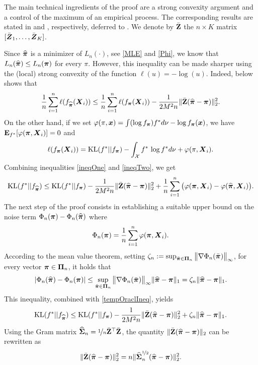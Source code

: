The main technical ingredients of the proof are a strong convexity argument and a control of
the maximum of an empirical process. The corresponding results are stated in 
and , respectively, deferred to  . We denote by 
$\bar{\mathbf Z}$ the $n\times K$ matrix $[\bar{\boldsymbol Z}_1,\ldots,\bar{\boldsymbol Z}_K]$.

Since $\widehat{\boldsymbol \pi}$ is a minimizer of $L_n(\cdot)$, see \eqref{MLE} and \eqref{Phi}, we know that
$L_n(\widehat{\boldsymbol \pi})\le L_n(\boldsymbol \pi)$ for every $\pi$. However, this inequality can be made sharper using the
(local) strong convexity of the function $\ell(u) = -\log(u)$. Indeed,  below
shows that
\begin{equation}\label{ineqOne}
\frac{1}{n}\sum_{i=1}^n \ell(f_{\widehat{\boldsymbol \pi}}(\boldsymbol X_i)) \leq
\frac{1}{n}\sum_{i=1}^n \ell(f_{\boldsymbol \pi}(\boldsymbol X_i)) - \frac{1}{2M^2n}\|\bar{\mathbf Z}(\widehat{\boldsymbol \pi}-\boldsymbol \pi)\|^2_2.
\end{equation}
On the other hand, if we set $\varphi(\pi,\boldsymbol x) = \int (\log f_{\boldsymbol \pi})f^*d\nu -\log f_{\boldsymbol \pi}(\boldsymbol x)$, 
we have $\mathbf E_{f^*}[\varphi(\boldsymbol \pi,\boldsymbol X_i)]=0$ and
\begin{equation}\label{ineqTwo}
\ell(f_{\boldsymbol \pi}(\boldsymbol X_i)) = {\rm KL}(f^*||f_{\boldsymbol \pi}) -\int_{\mathcal X} f^*\,\log f^*d\nu+\varphi(\pi,\boldsymbol X_i).
\end{equation}
Combining inequalities \eqref{ineqOne} and \eqref{ineqTwo}, we get
\begin{equation}
\label{tempOraclIneq}
{\rm KL}(f^*|| f_{\widehat{\boldsymbol \pi}}) \leq {\rm KL}(f^*|| f_{\boldsymbol \pi})-\frac{1}{2M^2n}\|\bar{\mathbf Z}(\widehat{\boldsymbol \pi}-\boldsymbol \pi)\|_2^2
+ \frac1n\sum_{i=1}^n \big(\varphi(\boldsymbol \pi,\boldsymbol X_i)-\varphi(\widehat{\boldsymbol \pi},\boldsymbol X_i)\big).
\end{equation}
The next step of the proof consists in establishing a suitable upper bound on the noise term
$\Phi_n(\boldsymbol \pi)-\Phi_n(\widehat{\boldsymbol \pi})$
where
\begin{equation}
\Phi_n(\boldsymbol \pi) = \frac1n\sum_{i=1}^n \varphi(\boldsymbol \pi,\boldsymbol X_i).
\end{equation}
According to the mean value theorem, setting  $\zeta_n:= \sup_{\bar{\boldsymbol \pi}\in\boldsymbol\Pi_n}\big\| \nabla \Phi_n(\bar{\boldsymbol \pi})\big\|_\infty$,
for every vector $\boldsymbol \pi\in \boldsymbol\Pi_n$,
it holds that
\begin{equation}
|\Phi_n(\widehat{\boldsymbol \pi})-\Phi_n(\boldsymbol \pi)|\leq \sup_{\bar{\boldsymbol \pi}\in\boldsymbol\Pi_n}\big\| \nabla \Phi_n(\bar{\boldsymbol \pi})\big\|_\infty \|\widehat{\boldsymbol \pi}-\boldsymbol \pi \|_1 =
\zeta_n \|\widehat{\boldsymbol \pi}-\boldsymbol \pi \|_1.
\end{equation}
This inequality, combined  with \eqref{tempOraclIneq}, yields
\begin{equation}
\label{midIneqRes}
{\rm KL}(f^*|| f_{\widehat{\boldsymbol \pi}}) \leq {\rm KL}(f^*|| f_{\boldsymbol \pi})-\frac{1}{2M^2n}\|\bar{\mathbf Z}(\widehat{\boldsymbol \pi}-\boldsymbol \pi)\|_2^2
+ \zeta_n\|\widehat{\boldsymbol \pi} - \boldsymbol \pi \|_1.
\end{equation}
Using the Gram matrix $\widehat{\boldsymbol\Sigma}_n = \nicefrac1n\bar{\mathbf Z}^\top\bar{\mathbf Z}$, the quantity 
$\|\bar{\mathbf Z}(\widehat{\boldsymbol \pi} - \boldsymbol \pi)\|_2$ can be rewritten as
\begin{equation}
\label{gramRewrite}
\|\bar{\mathbf Z}(\widehat{\boldsymbol \pi} - \boldsymbol \pi)\|_2^2 = n\|\widehat{\boldsymbol\Sigma}_n^{\nicefrac12} (\widehat{\boldsymbol \pi} - \boldsymbol \pi)\|_2^2.
\end{equation}

